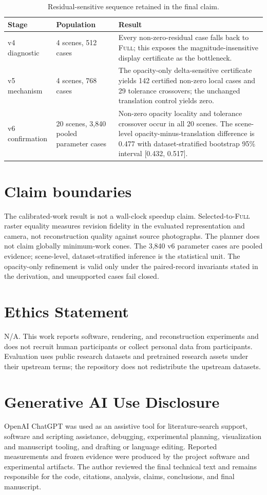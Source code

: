 \documentclass[11pt]{article}
\begin{document}
\begin{table}[h]
\centering
\caption{Residual-sensitive sequence retained in the final claim.}
\begin{tabular}{p{}p{}p{}}
\toprule
Stage & Population & Result \\
\midrule
v4 diagnostic & 4 scenes, 512 cases & Every non-zero-residual case falls back to \textsc{Full}; this exposes the magnitude-insensitive display certificate as the bottleneck. \\
v5 mechanism & 4 scenes, 768 cases & The opacity-only delta-sensitive certificate yields 142 certified non-zero local cases and 29 tolerance crossovers; the unchanged translation control yields zero. \\
v6 confirmation & 20 scenes, 3,840 pooled parameter cases & Non-zero opacity locality and tolerance crossover occur in all 20 scenes. The scene-level opacity-minus-translation difference is 0.477 with dataset-stratified bootstrap 95\% interval [0.432, 0.517]. \\
\bottomrule
\end{tabular}
\end{table}



\section{Claim boundaries}
The calibrated-work result is not a wall-clock speedup claim. Selected-to-\textsc{Full} raster equality measures revision fidelity in the evaluated representation and camera, not reconstruction quality against source photographs. The planner does not claim globally minimum-work cones. The 3,840 v6 parameter cases are pooled evidence; scene-level, dataset-stratified inference is the statistical unit. The opacity-only refinement is valid only under the paired-record invariants stated in the derivation, and unsupported cases fail closed.

\section{Ethics Statement}
N/A. This work reports software, rendering, and reconstruction experiments and does not recruit human participants or collect personal data from participants. Evaluation uses public research datasets and pretrained research assets under their upstream terms; the repository does not redistribute the upstream datasets.

\section{Generative AI Use Disclosure}
OpenAI ChatGPT was used as an assistive tool for literature-search support, software and scripting assistance, debugging, experimental planning, visualization and manuscript tooling, and drafting or language editing. Reported measurements and frozen evidence were produced by the project software and experimental artifacts. The author reviewed the final technical text and remains responsible for the code, citations, analysis, claims, conclusions, and final manuscript.
\end{document}
